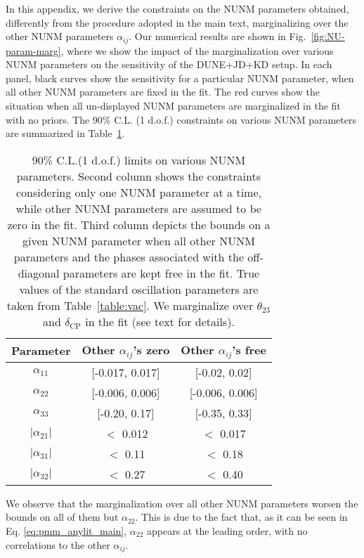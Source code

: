 \documentclass[11pt,a4paper]{article}
\newcommand{\capdef}{}
\newcommand{\mycaption}[2][\capdef]{\renewcommand{\capdef}{#2}
	\caption[#1]{{\footnotesize #2}}}
\begin{document}
\begin{appendix}
In this appendix, we derive the constraints on the NUNM parameters obtained, differently from the procedure adopted in the main text, marginalizing over the other NUNM parameters $\alpha_{ij}$. Our numerical results are shown in Fig.~\ref{fig:NU-param-marg}, where we show the impact of the marginalization over various NUNM parameters on the sensitivity of the DUNE+JD+KD setup. 
 In each panel, black curves show the sensitivity for a particular NUNM parameter, when all other NUNM parameters are fixed in the fit. The red curves show the situation when all un-displayed NUNM parameters are marginalized in the fit with no priors.
The 90\% C.L. (1 d.o.f.) constraints on various NUNM parameters are summarized in Table~\ref{tab:NUNM_marg}.
 \begin{table}
 	\centering
 	\begin{tabular}{|c|c|c|}
 		\hline\hline
 		Parameter & Other $\alpha_{ij}$'s zero & Other $\alpha_{ij}$'s free \\ 
 		\hline
 		$\alpha_{11}$& [-0.017, 0.017] & [-0.02, 0.02] \\
 		\hline
 		$\alpha_{22}$ & [-0.006, 0.006] &  [-0.006, 0.006] \\
 		\hline
 		$\alpha_{33}$ & [-0.20, 0.17] & [-0.35, 0.33] \\
 		\hline
 		$|\alpha_{21}|$ & $<$ 0.012  & $<$ 0.017\\ 
 		\hline
 		$|\alpha_{31}|$ & $<$ 0.11 & $<$ 0.18\\
 		\hline
 		$|\alpha_{32}|$ & $<$ 0.27 & $<$ 0.40\\
 		\hline\hline
 	\end{tabular}
 	\mycaption{90\% C.L.(1 d.o.f.) limits on various NUNM parameters. Second column shows the constraints considering only one NUNM parameter at a time, while other NUNM parameters are assumed to be zero in the fit. Third column depicts the bounds on a given NUNM parameter when all other NUNM parameters and the phases associated with the off-diagonal parameters are kept free in the fit. True values of the standard oscillation parameters are taken from Table~\ref{table:vac}. We marginalize over $\theta_{23}$ and $\delta_{\mathrm{CP}}$ in the fit (see text for details). \label{tab:NUNM_marg}} 
 \end{table}
We observe that the marginalization over all other NUNM parameters worsen the bounds on all of them but $\alpha_{22}$. This is due to the fact that, as it can be seen in Eq. \ref{eq:pmm_anylit_main}, $\alpha_{22}$ appears at the leading order, with no correlations to the other $\alpha_{ij}$.

\end{appendix}
\end{document}

